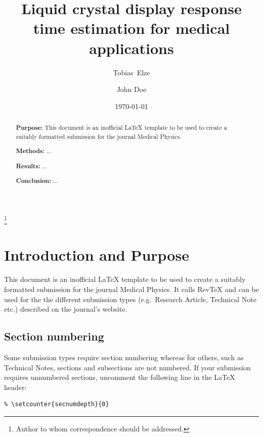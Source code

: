 \documentclass[aps,prb,preprint,groupedaddress,showkeys]{revtex4}
\begin{document}
\def\papertitle{Liquid crystal display response time estimation for 
medical applications}
\title{\papertitle}

\author{Tobias~Elze}
\thanks{Author to whom correspondence should be addressed.}
\author{John Doe}

\date{\today}

\begin{abstract}	%
\textbf{Purpose:} This document is an inofficial \LaTeX{} template to be used
to create a suitably formatted submission for the journal Medical Physics.

\textbf{Methods:} ...

\textbf{Results:} ...

\textbf{Conclusion:} ...
\end{abstract}

\maketitle

\linenumbers\modulolinenumbers[5]

\section{Introduction and Purpose}

This document is an inofficial \LaTeX{} template to be used
to create a suitably formatted submission for the journal Medical Physics.
It calls RevTeX and can be used for the the different submission types
(e.g.~Research Article, Technical Note etc.) described on the journal's
website.

\subsection{Section numbering}

Some submission types require section numbering whereas for others,
such as Technical Notes, sections and subsections are not numbered.
If your submission requires unnumbered sections, uncomment the
following line in the \LaTeX{} header:
\begin{verbatim}
% \setcounter{secnumdepth}{0}
\end{verbatim}
\end{document}
